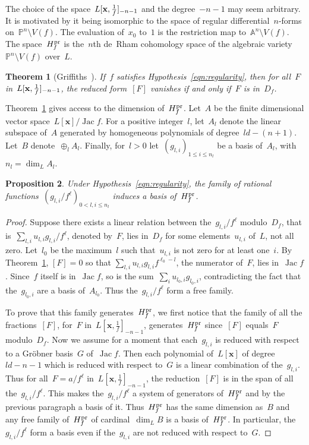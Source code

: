 \documentclass{sig-alternate}
\newtheorem{thm}{Theorem}
\newtheorem{prop}[thm]{Proposition}
\newcommand{\Lx}{L[\mathbf x]}
\DeclareMathOperator{\Jac}{Jac}
\newcommand{\PP}{\mathbb{P}}
\newcommand{\xx}{\mathbf{x}}
\newcommand{\pr}{{\smash{\mathrm{pr}}}}
\newcommand{\Hfp}{H_f^{\pr}}
\newcommand{\Lxfp}{\Lxf_{\smash{-n-1}}}
\newcommand{\Lxf}{L[\xx,\smash{\tfrac{1}{f}}]}
\begin{document}
The choice of the space~$\Lxfp$ and the degree~$-n-1$ may seem arbitrary. It is motivated by it being isomorphic to the space of regular differential~$n$-forms on~$\PP^n\setminus V(f)$.
The evaluation of~$x_0$ to~$1$ is the restriction map to~$\mathbb{A}^n\setminus V(f)$.
The space~$\Hfp$ is the~$n$th de~Rham cohomology space of the algebraic variety~$\PP^n\setminus V(f)$ over~$L$.



\begin{thm}[Griffiths~{\cite[\S4]{Gri69}}]\label{thm:griffiths}
  \hspace{.5em} If~$f$ satisfies Hypothesis~\eqref{eqn:regularity},
   then for all~$F$ in~$\Lxfp$,
 the reduced form~$[F]$ vanishes if and only if~$F$ is in~$D_f$.
\end{thm}


Theorem~\ref{thm:griffiths} gives access to the dimension of~$\Hfp$.
Let~$A$ be the finite dimensional vector space~$\Lx/\!\Jac f$.
For a positive integer~$l$, let~$A_l$ denote the linear subspace of~$A$ generated by homogeneous polynomials of degree~$ld-(n+1)$. 
Let~$B$ denote~$\oplus_l A_l$.
Finally, for~$l>0$ let~$(g_{l,i})_{1\leqslant i \leqslant n_l}$ be a basis of~$A_l$, with~$n_l = \dim_L A_l$. 

\begin{prop}\label{coro:hbasis}
Under Hypothesis~\eqref{eqn:regularity}, the family of rational functions~$\left(g_{l,i}/f^\ell\right)_{0<l,i\leqslant n_l}$ induces a basis of~$\Hfp$.
\end{prop}

\begin{proof}
Suppose there exists a linear relation between the~$g_{l,i}/f^\ell$ modulo~$D_f$, that is~$\sum_{l,i} u_{l,i}g_{l,i}/f^\ell$, denoted by~$F$, lies in~$D_f$ for some elements~$u_{l,i}$ of~$L$, not all zero.
Let~$l_0$ be the maximum~$l$ such that~$u_{l,i}$ is not zero for at least one~$i$.
By Theorem~\ref{thm:griffiths}, $[F]=0$ so that 
$\sum_{l,i}u_{l,i}g_{l,i}f^{\ell_0-l}$, the numerator of~$F$, lies in~$\Jac f$.
Since~$f$ itself is in~$\Jac f$, so is the sum~$\sum_i u_{l_0, i}g_{l_0, i}$, contradicting the fact that the~$g_{l_0,i}$ are a basis of~$A_{l_0}$. 
Thus the~$g_{l,i}/f^\ell$ form a free family.

To prove that this family generates~$\Hfp$, we first notice that the family of all the fractions~$[F]$, for~$F$ in~$L[\xx,\tfrac{1}{f}]_{-n-1}$, generates~$\Hfp$ since~$[F]$ equals~$F$ modulo~$D_f$.
Now we assume for a moment that each~$g_{l,i}$ is reduced with respect to a Gr\"obner basis~$G$ of~$\Jac f$.
Then each polynomial of~$\Lx$ of degree~$ld-n-1$ which is reduced with respect to~$G$ is a linear combination of the~$g_{l,i}$.
Thus for all~$F=a/f^\ell$ in~$L[\xx,\tfrac{1}{f}]_{-n-1}$, the reduction~$[F]$ is in the span of all the~$g_{l,i}/f^\ell$. This makes the~$g_{l,i}/f^\ell$ a system of generators of~$\Hfp$ and by the previous paragraph a basis of it. Thus~$\Hfp$ has the same dimension as~$B$ and
any free family of~$\Hfp$ of cardinal~$\dim_L B$ is a basis of~$\Hfp$.
In particular, the~$g_{l,i}/f^\ell$ form a basis even if the~$g_{l,i}$ are not reduced with respect to~$G$.
\end{proof}
\end{document}
